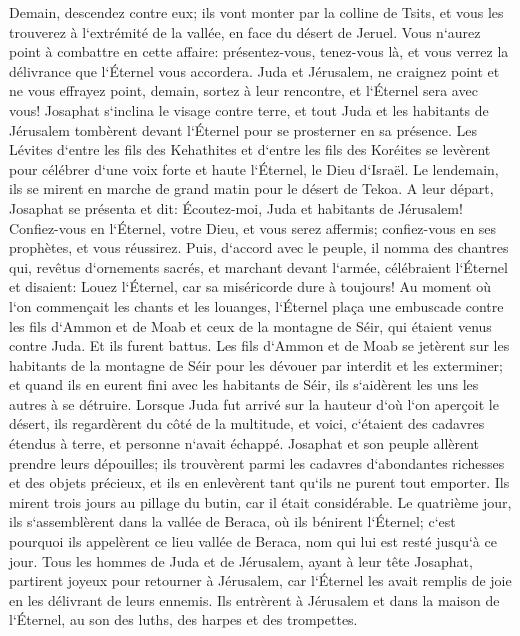 \verse Demain, descendez contre eux; ils vont monter par la colline de Tsits, et vous les trouverez à l`extrémité de la vallée, en face du désert de Jeruel. 
\verse Vous n`aurez point à combattre en cette affaire: présentez-vous, tenez-vous là, et vous verrez la délivrance que l`Éternel vous accordera. Juda et Jérusalem, ne craignez point et ne vous effrayez point, demain, sortez à leur rencontre, et l`Éternel sera avec vous! 
\verse Josaphat s`inclina le visage contre terre, et tout Juda et les habitants de Jérusalem tombèrent devant l`Éternel pour se prosterner en sa présence. 
\verse Les Lévites d`entre les fils des Kehathites et d`entre les fils des Koréites se levèrent pour célébrer d`une voix forte et haute l`Éternel, le Dieu d`Israël. 
\verse Le lendemain, ils se mirent en marche de grand matin pour le désert de Tekoa. A leur départ, Josaphat se présenta et dit: Écoutez-moi, Juda et habitants de Jérusalem! Confiez-vous en l`Éternel, votre Dieu, et vous serez affermis; confiez-vous en ses prophètes, et vous réussirez. 
\verse Puis, d`accord avec le peuple, il nomma des chantres qui, revêtus d`ornements sacrés, et marchant devant l`armée, célébraient l`Éternel et disaient: Louez l`Éternel, car sa miséricorde dure à toujours! 
\verse Au moment où l`on commençait les chants et les louanges, l`Éternel plaça une embuscade contre les fils d`Ammon et de Moab et ceux de la montagne de Séir, qui étaient venus contre Juda. Et ils furent battus. 
\verse Les fils d`Ammon et de Moab se jetèrent sur les habitants de la montagne de Séir pour les dévouer par interdit et les exterminer; et quand ils en eurent fini avec les habitants de Séir, ils s`aidèrent les uns les autres à se détruire. 
\verse Lorsque Juda fut arrivé sur la hauteur d`où l`on aperçoit le désert, ils regardèrent du côté de la multitude, et voici, c`étaient des cadavres étendus à terre, et personne n`avait échappé. 
\verse Josaphat et son peuple allèrent prendre leurs dépouilles; ils trouvèrent parmi les cadavres d`abondantes richesses et des objets précieux, et ils en enlevèrent tant qu`ils ne purent tout emporter. Ils mirent trois jours au pillage du butin, car il était considérable. 
\verse Le quatrième jour, ils s`assemblèrent dans la vallée de Beraca, où ils bénirent l`Éternel; c`est pourquoi ils appelèrent ce lieu vallée de Beraca, nom qui lui est resté jusqu`à ce jour. 
\verse Tous les hommes de Juda et de Jérusalem, ayant à leur tête Josaphat, partirent joyeux pour retourner à Jérusalem, car l`Éternel les avait remplis de joie en les délivrant de leurs ennemis. 
\verse Ils entrèrent à Jérusalem et dans la maison de l`Éternel, au son des luths, des harpes et des trompettes. 
